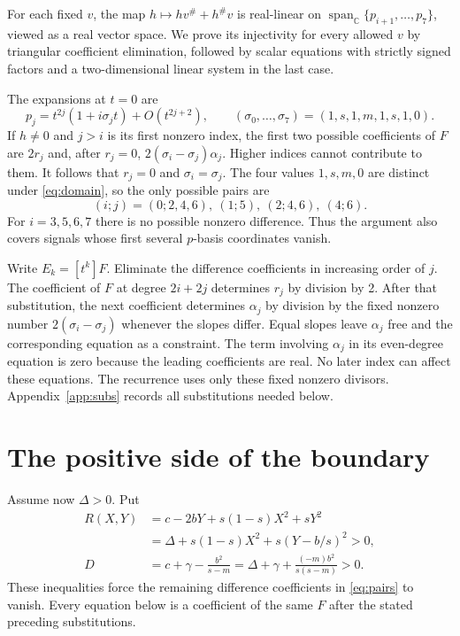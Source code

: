 \documentclass[11pt,a4paper]{article}
\newcommand{\CC}{\mathbb C}
\begin{document}
For each fixed $v$, the map $h\mapsto hv^\#+h^\#v$ is real-linear on
$\operatorname{span}_{\CC}\{p_{i+1},\ldots,p_7\}$, viewed as a real vector
space. We prove its injectivity for every allowed $v$ by triangular
coefficient elimination, followed by scalar equations with strictly signed
factors and a two-dimensional linear system in the last case.

The expansions at $t=0$ are
\[
 p_j=t^{2j}(1+i\sigma_jt)+O(t^{2j+2}),\qquad
 (\sigma_0,\ldots,\sigma_7)=(1,s,1,m,1,s,1,0).
\]
If $h\ne0$ and $j>i$ is its first nonzero index, the first two possible
coefficients of $F$ are $2r_j$ and, after $r_j=0$,
$2(\sigma_i-\sigma_j)\alpha_j$. Higher indices cannot contribute to them.
It follows that $r_j=0$ and $\sigma_i=\sigma_j$.
The four values $1,s,m,0$ are distinct under \eqref{eq:domain}, so the only
possible pairs are
\begin{equation}\label{eq:pairs}
 (i;j)=(0;2,4,6),\ (1;5),\ (2;4,6),\ (4;6).
\end{equation}
For $i=3,5,6,7$ there is no possible nonzero difference.
Thus the argument also covers signals whose first several $p$-basis coordinates vanish.

Write $E_k=[t^k]F$. Eliminate the difference coefficients in increasing
order of $j$. The coefficient of $F$ at degree $2i+2j$ determines
$r_j$ by division by 2. After that substitution, the next coefficient
determines $\alpha_j$ by division by the fixed nonzero number
$2(\sigma_i-\sigma_j)$ whenever the slopes differ. Equal slopes leave
$\alpha_j$ free and the corresponding equation as a constraint.
The term involving $\alpha_j$ in its even-degree equation is zero because
the leading coefficients are real. No later index can affect these equations.
The recurrence uses only these fixed nonzero divisors.
Appendix~\ref{app:subs} records all substitutions needed below.

\section{The positive side of the boundary}\label{sec:suff}
Assume now $\Delta>0$. Put
\begin{equation}\label{eq:RD}
\begin{aligned}
 R(X,Y)&=c-2bY+s(1-s)X^2+sY^2\\
       &=\Delta+s(1-s)X^2+s(Y-b/s)^2>0,\\
 D&=c+\gamma-\frac{b^2}{s-m}
   =\Delta+\gamma+\frac{(-m)b^2}{s(s-m)}>0.
\end{aligned}
\end{equation}
These inequalities force the remaining difference coefficients in \eqref{eq:pairs} to vanish.
Every equation below is a coefficient of the same $F$ after the stated
preceding substitutions.
\end{document}
